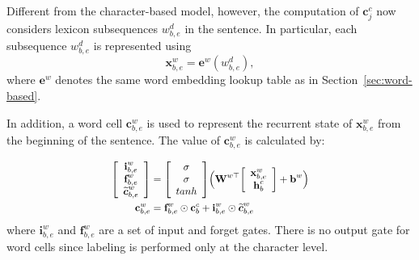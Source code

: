 \documentclass[11pt,a4paper]{article}
\newcommand*{\Scale}[2][4]{\scalebox{#1}{$#2$}}
\begin{document}
\begin{CJK*}{UTF8}{gbsn}
Different from the character-based model, however, the computation of $\textbf{c}^c_j$ now considers lexicon subsequences $w^d_{b, e}$ in the sentence. In particular, each subsequence $w^d_{b, e}$ is represented using
\begin{equation}
\textbf{x}^w_{b, e} = \textbf{e}^w(w^d_{b, e}),
\end{equation}
where $\textbf{e}^w$ denotes the same word embedding lookup table as in Section~\ref{sec:word-based}. 

In addition, a word cell $\textbf{c}^w_{b, e}$ is used to represent the recurrent state of $\textbf{x}^w_{b, e}$ from the beginning  of the sentence. The value of $\textbf{c}^w_{b, e}$ is calculated by:

\begin{equation}
\Scale[0.9]{
\begin{aligned}
{\left[ \begin{array}{c}
\textbf{i}_{b,e}^w \\
\textbf{f}_{b,e}^w\\
\boldsymbol{\widetilde{c}}_{b,e}^w 
\end{array} 
\right ]} 
&=
{\left[ \begin{array}{c}
\sigma \\
\sigma\\
tanh 
\end{array} 
\right ]} 
\Big(
\textbf{W}^{w\top}
{\left[ \begin{array}{c}
\textbf{x}^w_{b, e} \\
\textbf{h}_b^c\\ 
\end{array} 
\right ]} 
 +
\textbf{b}^w
 \Big)
\label{eq:word}\\
\textbf{c}^w_{b,e} &= \textbf{f}_{b, e}^w\odot \textbf{c}^c_b + \textbf{i}_{b, e}^w \odot \boldsymbol{\widetilde{c}}_{b, e}^w \\
\end{aligned}
}
\end{equation}
where $\textbf{i}_{b, e}^w$ and $\textbf{f}_{b, e}^w$ are a set of input and forget gates. There is no output gate for word cells since labeling is performed only at the character level.


\end{CJK*}
\end{document}
